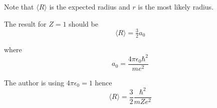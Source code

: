 Note that $\langle R\rangle$ is the expected radius and $r$ is the most likely radius.

\bigskip
The result for $Z=1$ should be
\begin{equation*}
\langle R\rangle=\tfrac{3}{2}a_0
\end{equation*}

where
\begin{equation*}
a_0=\frac{4\pi\epsilon_0\hbar^2}{me^2}
\end{equation*}

The author is using $4\pi\epsilon_0=1$ hence
\begin{equation*}
\langle R\rangle=\frac{3}{2}\frac{\hbar^2}{mZe^2}
\end{equation*}


